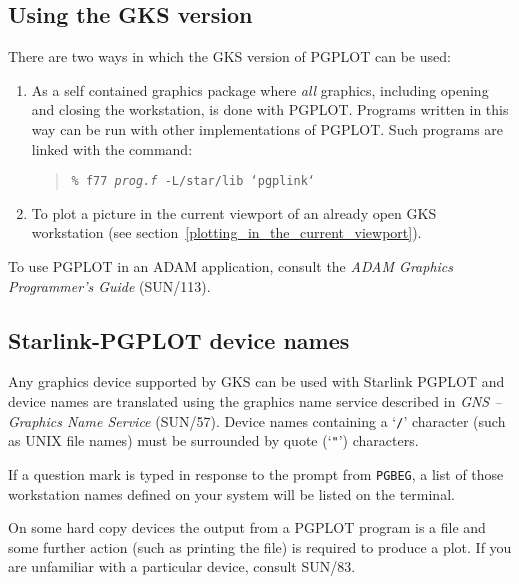 \documentclass[twoside,11pt]{article}
\newcommand{\htmlref}[2]{#1}
\newcommand{\latexhtml}[2]{#1}
\newcommand{\xref}[3]{#1}
\newcommand{\xlabel}[1]{}
\renewcommand{\_}{\texttt{\symbol{95}}}
\begin{document}
\subsection{\xlabel{using_the_gks_version}Using the GKS version}
\label{using_the_gks_version}

There are two ways in which the GKS version of PGPLOT can be used:

\begin{enumerate}

\item As a self contained graphics package where \emph{all} graphics, including
opening and closing the workstation, is done with PGPLOT. Programs written in
this way can be run with other implementations of PGPLOT. Such programs
are linked with the command:

\begin{quote}
\texttt{\% f77 \emph{prog.f} -L/star/lib `pgp\_link`}
\end{quote}

\item To plot a picture in the current viewport of an already open GKS
workstation (see \latexhtml{section~\ref{plotting_in_the_current_viewport}} %
{\htmlref{Plotting in the current viewport}{plotting_in_the_current_viewport}}).
\end{enumerate}

To use PGPLOT in an ADAM application, consult the
\xref{\emph{ADAM Graphics Programmer's Guide}}{sun113}{} (SUN/113).

\subsection{\xlabel{starlink-pgplot_device_names}Starlink-PGPLOT device names}
\label{starlink-pgplot_device_names}

Any graphics device supported by GKS can be used with Starlink PGPLOT
and device names are translated using the graphics name service
described in \xref{\emph{GNS -- Graphics Name
Service}}{sun57}{GKSWorkstationNames} (SUN/57).  Device names
containing a `\texttt{/}' character (such as UNIX file names) must be
surrounded by quote (`\texttt{"}') characters.

If a question mark is typed in response to the prompt from
\xref{\texttt{PGBEG}}{sun15}{PGBEG}, a list of those workstation names
defined on your system will be listed on the terminal.

On some hard copy devices the output from a PGPLOT program is a file
and some further action (such as printing the file) is required to
produce a plot.  If you are unfamiliar with a particular device,
consult \xref{SUN/83}{sun83}{}.
\end{document}
